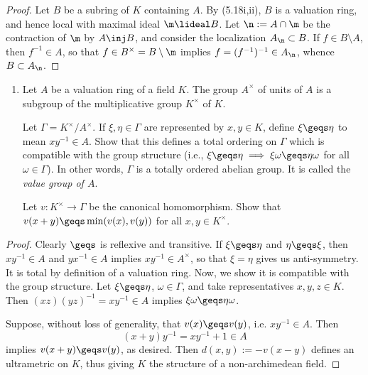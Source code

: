 \documentclass[12pt]{amsart}
\begin{document}
\begin{proof}
  Let $B$ be a subring of $K$ containing $A$.
  By (5.18i,ii), $B$ is a valuation ring, and hence local with maximal ideal $\m\lideal B$.
  Let $\n:=A\cap \m$ be the contraction of $\m$ by $A\inj B$, and consider the localization $A_\n\subset B$.
  If $f\in B\setminus A$, then $f^{-1}\in A$, so that $f\in B^\times = B\setminus \m$ implies $f=(f^{-1})^{-1}\in A_\n$, whence $B\subset A_\n$.
\end{proof}

\begin{enumerate}
  \item[5.30] {
      Let $A$ be a valuation ring of a field $K$.
      The group $A^\times$ of units of $A$ is a subgroup of the multiplicative group $K^\times$ of $K$.

      Let $\Gamma = K^\times/A^\times$.
      If $\xi,\eta\in \Gamma$ are represented by $x,y\in K$, define $\xi\geqs \eta$ to mean $xy^{-1}\in A$.
      Show that this defines a total ordering on $\Gamma$ which is compatible with the group structure (i.e., $\xi\geqs \eta\implies \xi\omega\geqs \eta\omega$ for all $\omega\in \Gamma$).
      In other words, $\Gamma$ is a totally ordered abelian group.
      It is called the \emph{value group of $A$}.

      Let $v:K^\times\to \Gamma$ be the canonical homomorphism.
      Show that $v(x+y)\geqs \min(v(x), v(y))$ for all $x,y\in K^\times$.
    }
\end{enumerate}

\begin{proof}
  Clearly $\geqs$ is reflexive and transitive.
  If $\xi\geqs \eta$ and $\eta\geqs \xi$, then $xy^{-1}\in A$ and $yx^{-1}\in A$ implies $xy^{-1}\in A^\times$, so that $\xi=\eta$ gives us anti-symmetry.
  It is total by definition of a valuation ring.
  Now, we show it is compatible with the group structure.
  Let $\xi\geqs \eta$, $\omega\in \Gamma$, and take representatives $x,y,z\in K$.
  Then $(xz)(yz)^{-1}=xy^{-1}\in A$ implies $\xi\omega\geqs \eta\omega$.

  Suppose, without loss of generality, that $v(x)\geqs v(y)$, i.e. $xy^{-1}\in A$.
  Then 
  \[
    (x+y)y^{-1}=xy^{-1}+1\in A
  \]
  implies $v(x + y)\geqs v(y)$, as desired.
  Then $d(x,y):= -v(x-y)$ defines an ultrametric on $K$, thus giving $K$ the structure of a non-archimedean field.
\end{proof}
\end{document}
